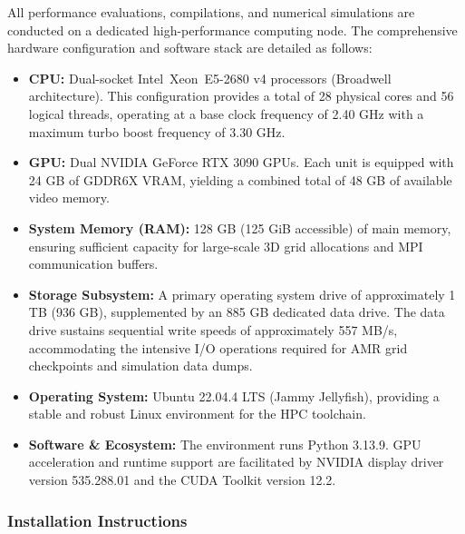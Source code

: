 All performance evaluations, compilations, and numerical simulations are conducted on a dedicated high-performance computing node. 
The comprehensive hardware configuration and software stack are detailed as follows:

\begin{itemize}
    \item \textbf{CPU:} Dual-socket Intel\textregistered~Xeon\textregistered~E5-2680 v4 processors (Broadwell architecture).
    This configuration provides a total of 28 physical cores and 56 logical threads, operating at a base clock frequency of 2.40 GHz with a maximum turbo boost frequency of 3.30 GHz.
    
    \item \textbf{GPU:} Dual NVIDIA GeForce RTX 3090 GPUs. 
    Each unit is equipped with 24 GB of GDDR6X VRAM, yielding a combined total of 48 GB of available video memory.
    
    \item \textbf{System Memory (RAM):} 128 GB (125 GiB accessible) of main memory, ensuring sufficient capacity for large-scale 3D grid allocations and MPI communication buffers.
    
    \item \textbf{Storage Subsystem:} A primary operating system drive of approximately 1 TB (936 GB), supplemented by an 885 GB dedicated data drive. 
    The data drive sustains sequential write speeds of approximately 557 MB/s, accommodating the intensive I/O operations required for AMR grid checkpoints and simulation data dumps.
    
    \item \textbf{Operating System:} Ubuntu 22.04.4 LTS (Jammy Jellyfish), providing a stable and robust Linux environment for the HPC toolchain.
    
    \item \textbf{Software \& Ecosystem:} The environment runs Python 3.13.9. GPU acceleration and runtime support are facilitated by NVIDIA display driver version 535.288.01 and the CUDA Toolkit version 12.2.
\end{itemize}

\subsubsection{Installation Instructions}

